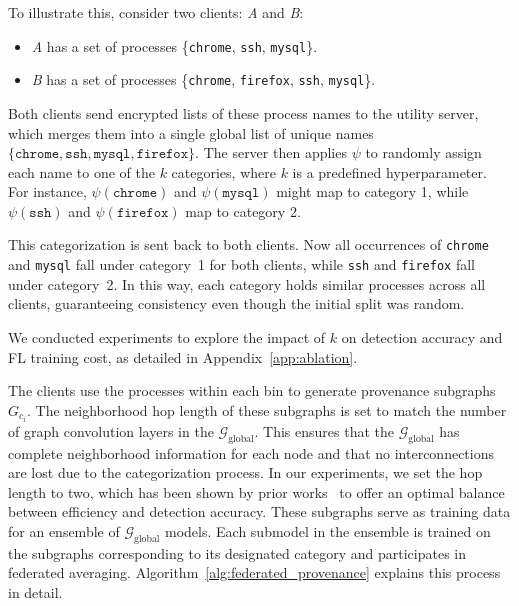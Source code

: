 To illustrate this, consider two clients: \emph{A} and \emph{B}:
\begin{itemize}
    \item \emph{A} has a set of processes \{\texttt{chrome}, \texttt{ssh}, \texttt{mysql}\}.
    \item \emph{B} has a set of processes \{\texttt{chrome}, \texttt{firefox}, \texttt{ssh}, \texttt{mysql}\}.
\end{itemize}

Both clients send encrypted lists of these process names to the utility server, which merges them into a single global list of unique names \(\{\texttt{chrome}, \texttt{ssh}, \texttt{mysql}, \texttt{firefox}\}\). The server then applies \( \psi \) to randomly assign each name to one of the \( k \) categories, where \( k \) is a predefined hyperparameter. For instance, \( \psi(\texttt{chrome}) \) and \( \psi(\texttt{mysql}) \) might map to category 1, while \( \psi(\texttt{ssh}) \) and \( \psi(\texttt{firefox}) \) map to category 2.

This categorization is sent back to both clients. Now all occurrences of \texttt{chrome} and \texttt{mysql} fall under category~1 for both clients, while \texttt{ssh} and \texttt{firefox} fall under category~2. In this way, each category holds similar processes across all clients, guaranteeing consistency even though the initial split was random.

We conducted experiments to explore the impact of \( k \) on detection accuracy and FL training cost, as detailed in Appendix~\ref{app:ablation}.

The clients use the processes within each bin to generate provenance subgraphs \( G_{c_i} \). The neighborhood hop length of these subgraphs is set to match the number of graph convolution layers in the \( \mathcal{G}_{\text{global}} \). This ensures that the \( \mathcal{G}_{\text{global}} \) has complete neighborhood information for each node and that no interconnections are lost due to the categorization process. In our experiments, we set the hop length to two, which has been shown by prior works~\cite{wang2022threatrace,flash2024} to offer an optimal balance between efficiency and detection accuracy. These subgraphs serve as training data for an ensemble of \( \mathcal{G}_{\text{global}} \) models. Each submodel in the ensemble is trained on the subgraphs corresponding to its designated category and participates in federated averaging. Algorithm~\ref{alg:federated_provenance} explains this process in detail.

